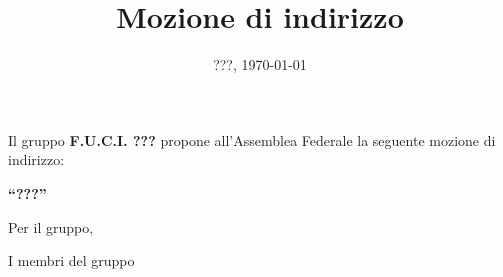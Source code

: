 \documentclass{fuci-article}
\title{Mozione di indirizzo}
\date{???, \today}
\begin{document}
\makecenteredtitle

Il gruppo \textbf{F.U.C.I. ???} propone all'Assemblea Federale la seguente
mozione di indirizzo:

\begin{center}
  \textbf{``???''}
\end{center}






\nocite{*}
\printbibliography[heading=none]

\vspace{2pt}

\begin{flushright}
  Per il gruppo, \\
\end{flushright}

\pagebreak

I membri del gruppo

\end{document}
